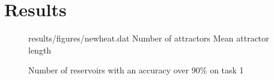 \chapter{Results}


\begin{figure*}
    \centering
    \myheatmap
        {results/figures/newheat.dat}
        {Number of attractors}
        {Mean attractor length}
    \caption{Number of reservoirs with an accuracy over 90\% on task 1}
\end{figure*}
